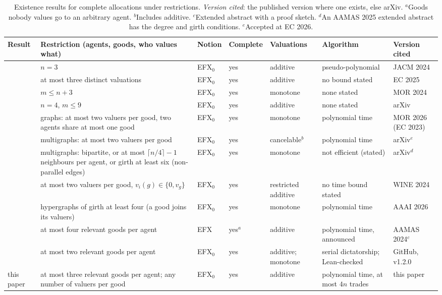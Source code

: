 \documentclass[runningheads,11pt]{llncs}
\newcommand{\efxz}{\texorpdfstring{\mbox{EFX$_0$}}{EFX0}}
\begin{document}
\begin{table}[htbp]
\caption{Existence results for complete allocations under restrictions. \emph{Version cited}: the published version where one exists, else arXiv. $^a$Goods nobody values go to an arbitrary agent. $^b$Includes additive. $^c$Extended abstract with a proof sketch. $^d$An AAMAS 2025 extended abstract has the degree and girth conditions. $^e$Accepted at EC 2026.}\label{tab:rw}
\centering\scriptsize
\setlength{\tabcolsep}{3pt}\begin{tabular}{@{}>{\raggedright\arraybackslash}p{}>{\raggedright\arraybackslash}p{}>{\raggedright\arraybackslash}p{}>{\raggedright\arraybackslash}p{}>{\raggedright\arraybackslash}p{}>{\raggedright\arraybackslash}p{}>{\raggedright\arraybackslash}p{}@{}}
\toprule
Result & Restriction (agents, goods, who values what) & Notion & Complete & Valuations & Algorithm & Version cited \\
\midrule
\cite{ChaudhuryGM20} & $n=3$ & \efxz{} & yes & additive & pseudo-polynomial & JACM 2024 \\
\cite{HVGNV25} & at most three distinct valuations & \efxz{} & yes & additive & no bound stated & EC 2025 \\
\cite{Mahara21} & $m\le n+3$ & \efxz{} & yes & monotone & none stated & MOR 2024 \\
\cite{AlkassarFM26} & $n=4$, $m\le9$ & \efxz{} & yes & additive & none stated & arXiv \\
\cite{ChristodoulouFKS23} & graphs: at most two valuers per good, two agents share at most one good & \efxz{} & yes & monotone & polynomial time & MOR 2026 (EC 2023) \\
\cite{AfshinmehrAMMS26} & multigraphs: at most two valuers per good & \efxz{} & yes & cancelable$^b$ & polynomial time & arXiv$^e$ \\
\cite{SgouritsaS25} & multigraphs: bipartite, or at most $\lceil n/4\rceil-1$ neighbours per agent, or girth at least six (non-parallel edges) & \efxz{} & yes & monotone & not efficient (stated) & arXiv$^d$ \\
\cite{KavianiSS24} & at most two valuers per good, $v_i(g)\in\{0,v_g\}$ & \efxz{} & yes & restricted additive & no time bound stated & WINE 2024 \\
\cite{LianeasSS26} & hypergraphs of girth at least four (a good joins its valuers) & \efxz{} & yes & monotone & polynomial time & AAAI 2026 \\
\cite{ViswanathanM24} & at most four relevant goods per agent & EFX & yes$^a$ & additive & polynomial time, announced & AAMAS 2024$^c$ \\
\cite{MrdEfx} & at most two relevant goods per agent & \efxz{} & yes & additive; monotone & serial dictatorship; Lean-checked & GitHub, v1.2.0 \\
this paper & at most three relevant goods per agent; any number of valuers per good & \efxz{} & yes & additive & polynomial time, at most $4n$ trades & this paper \\
\bottomrule
\end{tabular}
\end{table}
\end{document}
